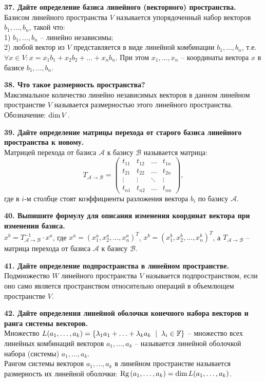\documentclass[11pt,a4paper]{article}
\newcommand{\F}{\mathbb{F}}
\newcommand{\A}{\mathcal{A}}
\newcommand{\B}{\mathcal{B}}
\newcommand{\Rg}[1]{\mathrm{Rg}\hspace{0.5mm}#1}
\newcommand{\Dim}[1]{\mathrm{dim}\hspace{0.5mm}#1}
\renewcommand{\mid}{\hspace{2mm}\middle|\hspace{2mm}}
\begin{document}
\textbf{37. Дайте определение базиса линейного (векторного) пространства.\\}
Базисом линейного пространства $V$ называется упорядоченный набор векторов $b_1, \hdots, b_n$, такой что:\\
1) $b_1, \hdots, b_n$ -- линейно независимы;\\
2) любой вектор из $V$ представляется в виде линейной комбинации $b_1, \hdots, b_n$, т.е. $\forall x \in V: x = x_1 b_1 + x_2 b_2 + \hdots + x_n b_n$. При этом $x_1, \hdots, x_n$ -- координаты вектора $x$ в базисе $b_1, \hdots, b_n$.
\pagebreak

\textbf{38. Что такое размерность пространства?\\}
Максимальное количество линейно независимых векторов в данном линейном пространстве $V$ называется размерностью этого линейного пространства. Обозначение: $\Dim{V}$.

\textbf{39. Дайте определение матрицы перехода от старого базиса линейного пространства к новому.\\}
Матрицей перехода от базиса $\A$ к базису $\B$ называется матрица:
$$T_{\A \rightarrow \B} =
\left( \begin{matrix}
t_{11} & t_{12} & \hdots & t_{1n} \\
t_{21} & t_{22} & \hdots & t_{2n} \\
\vdots & \vdots & \ddots & \vdots \\
t_{n1} & t_{n2} & \hdots & t_{nn}
\end{matrix} \right),$$
где в $i$-м столбце стоят коэффициенты разложения вектора $b_i$ по базису $\A$.

\textbf{40. Выпишите формулу для описания изменения координат вектора при изменении базиса.\\}
$x^b = T_{\A \rightarrow \B}^{-1} \cdot x^a$, где $x^a = \left( x_1^a, x_2^a, \hdots, x_n^a \right)^T$, $x^b = \left( x_1^b, x_2^b, \hdots, x_n^b \right)^T$, а $T_{\A \rightarrow \B}$ -- матрица перехода от базиса $\A$ к базису $\B$.

\textbf{41. Дайте определение подпространства в линейном пространстве.\\}
Подмножество $W$ линейного пространства $V$ называется подпространством, если оно само является пространством относительно операций в объемлющем пространстве $V$.

\textbf{42. Дайте определения линейной оболочки конечного набора векторов и ранга системы векторов.\\}
Множество $L(a_1, \hdots, a_k) = \left\{ \lambda_1 a_1 + \hdots + \lambda_k a_k \mid \lambda_i \in \F \right\}$ -- множество всех линейных комбинаций векторов $a_1, \hdots, a_k$ -- называется линейной оболочкой набора (системы) $a_1, \hdots, a_k$.\\
Рангом системы векторов $a_1, \hdots, a_k$ в линейном пространстве называется размерность их линейной оболочки: $\Rg{(a_1, \hdots, a_k)} = \Dim{L(a_1, \hdots, a_k)}$.
\end{document}
